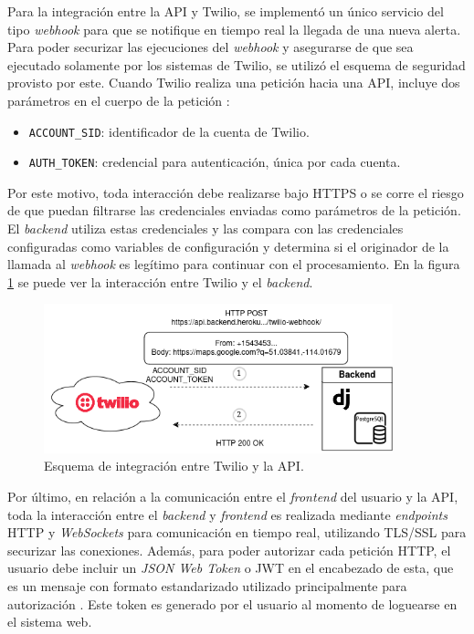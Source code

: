 Para la integración entre la API y Twilio, se implementó un único servicio del tipo \textit{webhook} para que se notifique en tiempo real la llegada de una nueva alerta. Para poder securizar las ejecuciones del \textit{webhook} y asegurarse de que sea ejecutado solamente por los sistemas de Twilio, se utilizó el esquema de seguridad provisto por este. Cuando Twilio realiza una petición hacia una API, incluye dos parámetros en el cuerpo de la petición \citep{TWILIO:2}:
\begin{itemize}
	\item \texttt{ACCOUNT\_SID}: identificador de la cuenta de Twilio.
	\item \texttt{AUTH\_TOKEN}: credencial para autenticación, única por cada cuenta.
\end{itemize}

Por este motivo, toda interacción debe realizarse bajo HTTPS o se corre el riesgo de que puedan filtrarse las credenciales enviadas como parámetros de la petición. El \textit{backend} utiliza estas credenciales y las compara con las credenciales configuradas como variables de configuración y determina si el originador de la llamada al \textit{webhook} es legítimo para continuar con el procesamiento. En la figura \ref{integracion:2} se puede ver la interacción entre Twilio y el \textit{backend}.

\begin{figure}[H]
	\centering
	\includegraphics[width=0.9\textwidth]{./Figures/integracion-2.png}
	\caption{Esquema de integración entre Twilio y la API.}
	\label{integracion:2}
\end{figure}


Por último, en relación a la comunicación entre el \textit{frontend} del usuario y la API, toda la interacción entre el \textit{backend} y \textit{frontend} es realizada mediante \textit{endpoints} HTTP y \textit{WebSockets} para comunicación en tiempo real, utilizando TLS/SSL para securizar las conexiones. Además, para poder autorizar cada petición HTTP, el usuario debe incluir un \textit{JSON Web Token} o JWT en el encabezado de esta, que es un mensaje con formato estandarizado utilizado principalmente para autorización \citep{JWT:1}. Este token es generado por el usuario al momento de loguearse en el sistema web.

